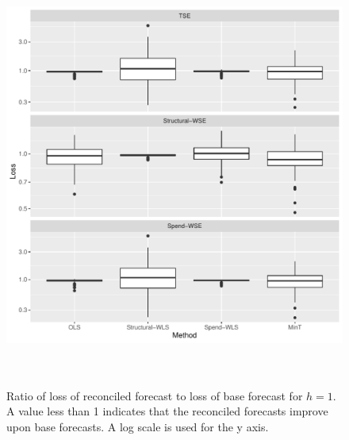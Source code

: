 \documentclass[12pt]{article}
\begin{document}
  	\begin{figure}[!hbt]
	\centering
	\small
	\includegraphics[width = \textwidth, height=14cm]{lossboxplots_4.pdf}
	\caption{Ratio of loss of reconciled forecast to loss of base forecast for $h = 1$. A value less than 1 indicates that the reconciled forecasts improve upon base forecasts.  A log scale is used for the y axis.}
	\label{fig:BaseVSRecon_Fch4}
\end{figure}
\end{document}
